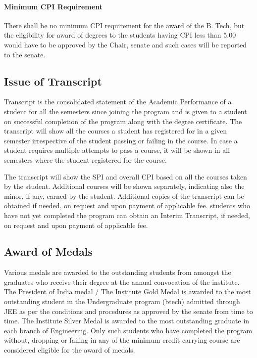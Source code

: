\paragraph{Minimum CPI Requirement} There shall be no minimum CPI requirement for the award of the B. Tech, but the eligibility for award of degrees to the \glspl{student} having CPI less than 5.00 would have to be approved by the Chair, \Gls{senate} and such cases will be reported to the \Gls{senate}. 

\subsection{Issue of Transcript}

Transcript is the consolidated statement of the Academic Performance of a \gls{student} for all the semesters since joining the program and is given to a \gls{student} on successful completion of the program along with the degree certificate.
The transcript will show all the courses a \gls{student} has registered for in a given semester irrespective of the \gls{student} passing or failing in the course. In case a student requires multiple attempts to pass a course, it will be shown in all semesters where the \gls{student} registered for the course.

The transcript will show the SPI and overall CPI based on all the courses taken by the \gls{student}. Additional courses will be shown separately, indicating also the minor, if any, earned by the \gls{student}. Additional copies of the transcript can be obtained if needed, on request and upon payment of applicable fee. \Glspl{student} who have not yet completed the program can obtain an Interim Transcript, if needed, on request and upon payment of applicable fee.

\subsection{Award of Medals}

Various medals are awarded to the outstanding \glspl{student} from amongst the graduates who receive their degree at the annual convocation of the \gls{institute}. The President of India medal / The Institute Gold Medal is awarded to the most outstanding \gls{student} in the Undergraduate program (\acrshort{btech}) admitted through JEE as per the conditions and procedures as approved by the \Gls{senate} from time to time. The Institute Silver Medal is awarded to the most outstanding graduate in each branch of Engineering. Only such \glspl{student} who have completed the program without, dropping or failing in any of the minimum credit carrying course are considered eligible for the award of medals.